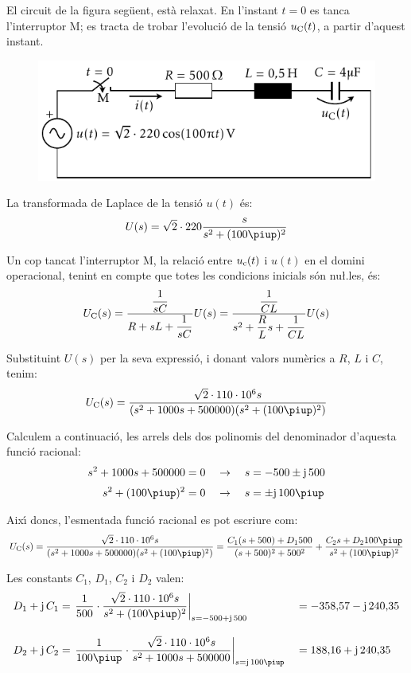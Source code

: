 \break
\begin{exemple}
El circuit de la figura seg\"{u}ent, est\`{a} relaxat. En l'instant $t=0$ es
tanca l'interruptor M; es tracta de trobar l'evoluci\'{o} de la tensi\'{o}
$u_\mathrm{C}(t)$, a partir d'aquest instant.
\begin{figure}[h]
\centering
    \includegraphics{Imatges/Cap-Laplace-Exemple4-Circuit.pdf}
\end{figure}


La transformada de Laplace de la tensi\'{o} $u(t)$ \'{e}s:
\[
    U(s) = \sqrt{2}\cdot 220 \frac{s}{s^2 + (100\piup)^2}
\]

Un cop tancat l'interruptor M, la relaci\'{o} entre $u_\mathrm{c}(t)$ i
$u(t)$ en el domini operacional, tenint en compte que totes les
condicions inicials s\'{o}n nu{\l.l}es, \'{e}s:
\[
    U_\mathrm{C}(s) = \frac{\dfrac{1}{sC}}{R+ sL +\dfrac{1}{sC}} U(s)=
    \frac{\dfrac{1}{CL}}{s^2 + \dfrac{R}{L}s +\dfrac{1}{CL}} U(s)
\]

Substituint $U(s)$ per la seva expressi\'{o}, i donant valors num\`{e}rics a
$R$, $L$ i $C$, tenim:
\[
    U\ped{C}(s) = \frac{\sqrt{2}\cdot 110\cdot 10^6 s}{(s^2 + 1000 s + 500000)(s^2 + (100\piup)^2)}
\]

Calculem a continuaci\'{o}, les arrels dels dos polinomis  del
denominador d'aquesta funci\'{o} racional:
\begin{align*}
    s^2 + 1000 s + 500000 &= 0 \quad\rightarrow\quad s = -500
    \pm\ju\,500 \\[0.5ex]
    s^2 + (100\piup)^2 &= 0 \quad\rightarrow\quad s = \pm\ju\,100\piup
\end{align*}

Aix\'{\i} doncs, l'esmentada funci\'{o} racional es pot escriure com:
\[
U\ped{C}(s) =\frac{\sqrt{2}\cdot 110\cdot 10^6 s}{(s^2 + 1000 s +
500000)(s^2 + (100\piup)^2)}  = \frac{C_1 (s+500) + D_1
500}{(s+500)^2+500^2} + \frac{C_2 s + D_2 100 \piup}{s^2 +(100\piup)^2}
\]

Les constants $C_1$, $D_1$,  $C_2$ i $D_2$ valen:
\begin{alignat*}{2}
    D_1 + \ju\,C_1 &= \left.\frac{1}{500}\cdot \frac{\sqrt{2}\cdot 110\cdot 10^6 s}
    {s^2 +(100\piup)^2}\right|_{s=-500+\ju\,500} &&=-358{,}57 -\ju\,
    240{,}35\\[2ex]
    D_2 + \ju\,C_2 &= \left.\frac{1}{100\piup}\cdot\frac{\sqrt{2}\cdot 110\cdot 10^6 s}
    {s^2 + 1000 s + 500000}\right|_{s=\ju\,100\piup} &&= 188{,}16 + \ju\,240{,}35
\end{alignat*}


\end{exemple}
